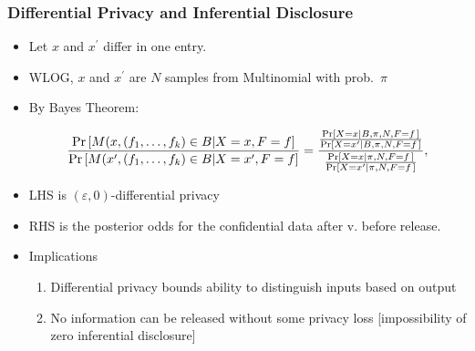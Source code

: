 \begin{frame}[allowframebreaks]%
\frametitle{Differential Privacy and Inferential Disclosure}
\begin{itemize}

\item Let $x$ and $x^{\prime }$ differ in one entry.
\item WLOG, $x$ and $x^{\prime }$ are $N$ samples from Multinomial with prob.\ $\pi $
\item By Bayes Theorem:

\begin{equation*}
\frac{\Pr \left[ M(x,(f_{1},\ldots ,f_{k})\in B|X=x,F=f\right] }{\Pr \left[
M(x^{\prime },(f_{1},\ldots ,f_{k})\in B|X=x^{\prime },F=f\right] }=\frac{%
\frac{\Pr \left[ X=x\left\vert B,\pi ,N,F=f\right. \right] }{\Pr \left[
X=x^{\prime }\left\vert B,\pi ,N,F=f\right. \right] }}{\frac{\Pr \left[
X=x\left\vert \pi ,N,F=f\right. \right] }{\Pr \left[ X=x^{\prime }\left\vert
\pi ,N,F=f\right. \right] }},  \label{eq:posterior_odds}
\end{equation*}%
\item LHS is $(\varepsilon,0)$-differential privacy
\item RHS is the posterior odds for the confidential data after v. before release.
\item Implications
\begin{enumerate}
	\item Differential privacy bounds ability to distinguish inputs based on output
	\item No information can be released without some privacy loss [impossibility of zero inferential disclosure]
\end{enumerate}
\end{itemize}
\end{frame}%
%



